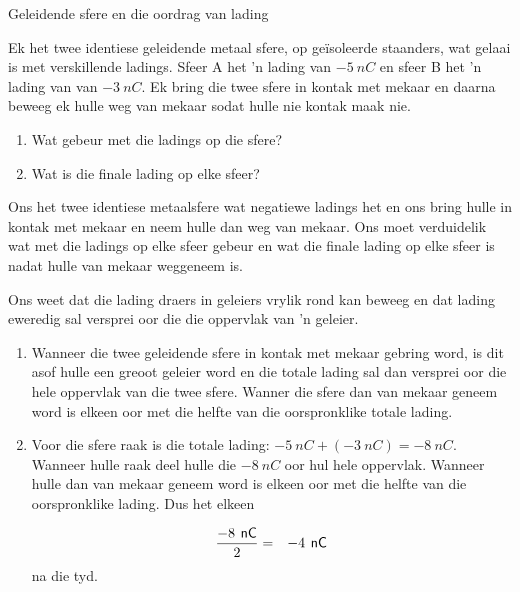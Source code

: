 \begin{wex}{Geleidende sfere en die oordrag van lading}
{
Ek het twee identiese geleidende metaal sfere, op ge\"isoleerde staanders, wat gelaai is met verskillende ladings. Sfeer A het 'n lading van $-5~nC$ en sfeer B het 'n lading van van $-3~nC$. Ek bring die twee sfere in kontak met mekaar en daarna beweeg ek hulle weg van mekaar sodat hulle nie kontak maak nie.
\begin{enumerate}[itemsep=5pt, label=\textbf{\arabic*}.] 
    \item Wat gebeur met die ladings op die sfere?
    \item Wat is die finale lading op elke sfeer?
\end{enumerate}
}
{


Ons het twee identiese metaalsfere wat negatiewe ladings het en ons bring hulle in kontak met mekaar en neem hulle dan weg van mekaar. Ons moet verduidelik wat met die ladings op elke sfeer gebeur en wat die finale lading op elke sfeer is nadat hulle van mekaar weggeneem is.
      

Ons weet dat die lading draers in geleiers vrylik rond kan beweeg en dat lading eweredig sal versprei oor die die oppervlak van 'n geleier. \par
      

\begin{enumerate}[noitemsep, label=\textbf{\alph*}. ] 
    \item  Wanneer die twee geleidende sfere in kontak met mekaar gebring word, is dit asof hulle een greoot geleier word en die totale lading sal dan versprei oor die hele oppervlak van die twee sfere. Wanner die sfere dan van mekaar geneem word is elkeen oor met die helfte van die oorspronklike totale lading.

    \item Voor die sfere raak is die totale lading: $-5~nC + (-3~nC) = -8~nC$. Wanneer hulle raak deel hulle die $-8~nC$ oor hul hele oppervlak. Wanneer hulle dan van mekaar geneem word is elkeen oor met die helfte van die oorspronklike lading. Dus het elkeen
    
\begin{eqnarray*}
    \frac{-8\phantom{\rule{4pt}{0ex}}\mathsf{nC}}{2}& =& -4\phantom{\rule{4pt}{0ex}}\mathsf{nC}
      \end{eqnarray*}
na die tyd.
\end{enumerate}}
\end{wex}


